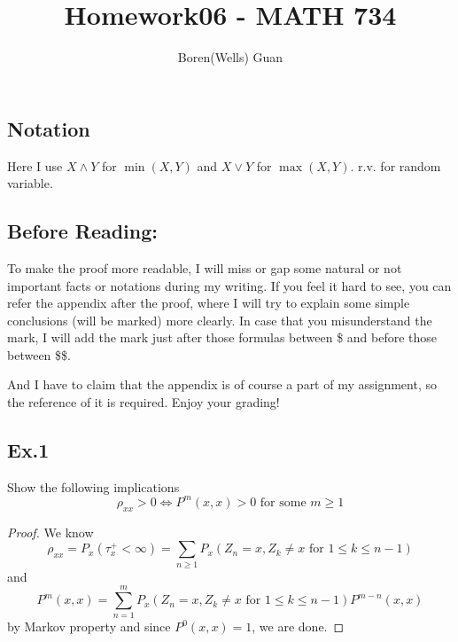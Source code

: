 \documentclass[lang=en,11pt,a4paper,citestyle =authoryear]{elegantpaper}
\title{Homework06 - MATH 734}
\author{Boren(Wells) Guan}
\begin{document}
\maketitle

\subsection*{Notation}
Here I use $X \wedge Y$ for $\min(X,Y)$ and $X\vee Y$ for $\max(X,Y)$. r.v. for random variable.

\subsection*{Before Reading:}\par
To make the proof more readable, I will miss or gap some natural or not important facts or notations during my writing. If you feel it hard to see, you can refer the appendix after the proof, where I will try to explain some simple conclusions (will be marked) more clearly. In case that you misunderstand the mark, I will add the mark just after those formulas between \$ and before those between \$\$.\par
And I have to claim that the appendix is of course a part of my assignment, so the reference of it is required. Enjoy your grading!

\subsection*{Ex.1} 
Show the following implications
\[\rho_{xx} > 0\Leftrightarrow P^m(x,x) > 0\text{ for some }m\geq 1\]
\begin{proof}
We know
\[\rho_{xx} = P_x(\tau_x^{+} < \infty) = \sum\limits_{n\geq 1}P_x(Z_n = x, Z_k \neq x\text{ for }1\leq k \leq n-1)\]
and
\[
P^m(x,x) = \sum\limits_{n= 1}^m P_x(Z_n = x, Z_k \neq x\text{ for }1\leq k \leq n-1)P^{m-n}(x,x)
\]
by Markov property and since $P^{0}(x,x) = 1$, we are done.
\end{proof}
\end{document}
